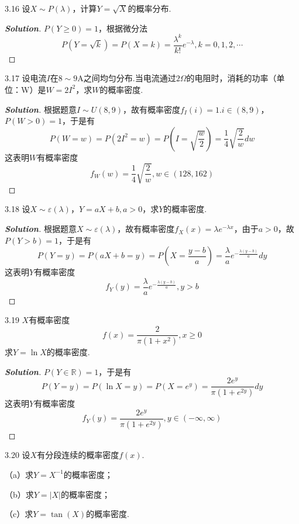 \documentclass[10pt, a4paper, oneside]{ctexart}
\newenvironment{solution}{\begin{proof}[\bf Solution]}{\end{proof}}
\begin{document}
3.16 设$X\sim P(\lambda)$，计算$Y=\sqrt{X}$的概率分布.
\begin{solution}
$P(Y\geqslant 0)=1$，根据微分法
\[P(Y = \sqrt k ) = P(X = k) = \frac{{{\lambda ^k}}}{{k!}}{e^{ - \lambda }},k = 0,1,2, \cdots \]
\end{solution}

3.17 设电流$I$在$8\sim 9$A之间均匀分布.当电流通过$2\Omega$的电阻时，消耗的功率（单位：W）是$W=2I^2$，求$W$的概率密度.
\begin{solution}
根据题意$I\sim U(8,9)$，故有概率密度$f_I(i)=1.i\in (8,9)$，$P(W>0)=1$，于是有
\[P(W = w) = P(2{I^2} = w) = P(I = \sqrt {\frac{w}{2}} ) = \frac{1}{4}\sqrt {\frac{2}{w}} dw\]
这表明$W$有概率密度
\[{f_W}(w) = \frac{1}{4}\sqrt {\frac{2}{w}},w\in(128,162) \]
\end{solution}

3.18 设$X\sim \varepsilon(\lambda)$，$Y=aX+b,a>0$，求$Y$的概率密度.
\begin{solution}
根据题意$X\sim \varepsilon(\lambda)$，故有概率密度$f_X(x)=\lambda e^{-\lambda x}$，由于$a>0$，故$P(Y>b)=1$，于是有
\[P(Y = y) = P(aX + b = y) = P(X = \frac{{y - b}}{a}) = \frac{\lambda }{a}{e^{ - \frac{{\lambda (y - b)}}{a}}}dy\]
这表明$Y$有概率密度
\[{f_Y}(y) = \frac{\lambda }{a}{e^{ - \frac{{\lambda (y - b)}}{a}}},y > b\]
\end{solution}

3.19 $X$有概率密度
\[f(x)=\frac{2}{\pi(1+x^2)},x\geqslant 0\]
求$Y=\ln X$的概率密度.
\begin{solution}
$P(Y\in \mathbb{R})=1$，于是有 
\[P(Y = y) = P(\ln X = y) = P(X = {e^y}) = \frac{{2{e^y}}}{{\pi (1 + {e^{2y}})}}dy\]
这表明$Y$有概率密度
\[{f_Y}(y) = \frac{{2{e^y}}}{{\pi (1 + {e^{2y}})}},y \in ( - \infty ,\infty )\]
\end{solution}

3.20 设$X$有分段连续的概率密度$f(x)$.

（a）求$Y=X^{-1}$的概率密度；

（b）求$Y=|X|$的概率密度；

（c）求$Y=\tan(X)$的概率密度.
\end{document}
